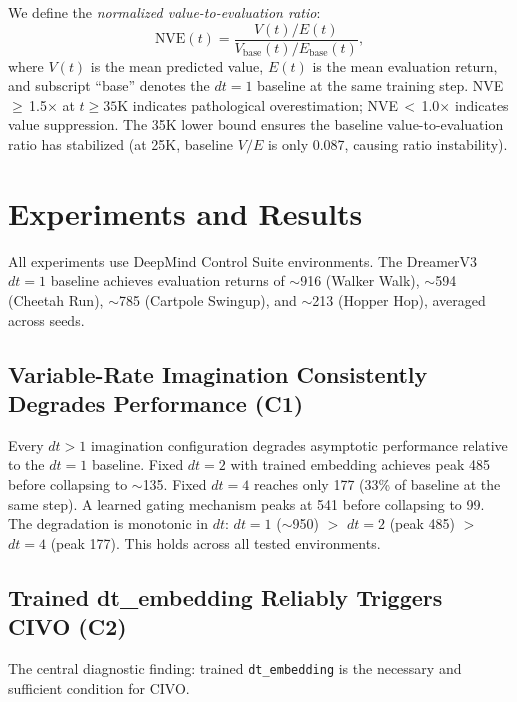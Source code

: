 \documentclass[10pt,letterpaper]{article}
\begin{document}
We define the \emph{normalized value-to-evaluation ratio}:
\begin{equation}
    \text{NVE}(t) = \frac{V(t) / E(t)}{V_{\text{base}}(t) / E_{\text{base}}(t)},
\end{equation}
where $V(t)$ is the mean predicted value, $E(t)$ is the mean evaluation return, and subscript ``base'' denotes the $dt=1$ baseline at the same training step.
NVE\,$\geq$\,1.5$\times$ at $t \geq 35$K indicates pathological overestimation; NVE\,$<$\,1.0$\times$ indicates value suppression.
The 35K lower bound ensures the baseline value-to-evaluation ratio has stabilized (at 25K, baseline $V/E$ is only 0.087, causing ratio instability).

\section{Experiments and Results}

All experiments use DeepMind Control Suite \cite{tassa2018deepmind} environments.
The DreamerV3 $dt=1$ baseline achieves evaluation returns of $\sim$916 (Walker Walk), $\sim$594 (Cheetah Run), $\sim$785 (Cartpole Swingup), and $\sim$213 (Hopper Hop), averaged across seeds.

\subsection{Variable-Rate Imagination Consistently Degrades Performance (C1)}

Every $dt>1$ imagination configuration degrades asymptotic performance relative to the $dt=1$ baseline.
Fixed $dt=2$ with trained embedding achieves peak 485 before collapsing to $\sim$135.
Fixed $dt=4$ reaches only 177 (33\% of baseline at the same step).
A learned gating mechanism peaks at 541 before collapsing to 99.
The degradation is monotonic in $dt$: $dt=1$ ($\sim$950) $>$ $dt=2$ (peak 485) $>$ $dt=4$ (peak 177).
This holds across all tested environments.

\subsection{Trained dt\_embedding Reliably Triggers CIVO (C2)}
\label{sec:c2}

The central diagnostic finding: trained \texttt{dt\_embedding} is the necessary and sufficient condition for CIVO.
\end{document}
